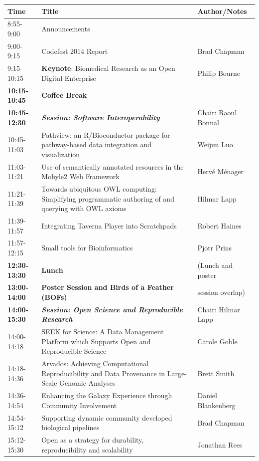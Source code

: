 \documentclass[12pt,oneside]{article}
\begin{document}
{\small
\begin{center}
\begin{tabular}{|p{2.175cm}|p{10.5cm}|p{3.7cm}|}
\hline
Time & Title & Author/Notes \\
\hline
8:55-9:00 & Announcements & \\
9:00-9:15 & Codefest 2014 Report & Brad Chapman\\
9:15-10:15 & \textbf{Keynote}: Biomedical Research as an Open Digital Enterprise & Philip Bourne\\
\hline
\textbf{10:15-10:45} & \textbf{Coffee Break} & \\
\hline
\textbf{10:45-12:30} & \textbf{\textit{Session: Software Interoperability}} & Chair: Raoul Bonnal\\
10:45-11:03 & Pathview: an R/Bioconductor package for pathway-based data integration and visualization & Weijun Luo\\
11:03-11:21 & Use of semantically annotated resources in the Mobyle2 Web Framework & Herv{\'e} M{\'e}nager\\
11:21-11:39 & Towards ubiquitous OWL computing: Simplifying programmatic authoring of and querying with OWL axioms & Hilmar Lapp\\
11:39-11:57 & Integrating Taverna Player into Scratchpads & Robert Haines\\
11:57-12:15 & Small tools for Bioinformatics & Pjotr Prins\\
\hline
\textbf{12:30-13:30} & \textbf{Lunch} & (Lunch and poster\\
\textbf{13:00-14:00} & \textbf{Poster Session and Birds of a Feather (BOFs)} & session overlap)\\
\hline
\textbf{14:00-15:30} & \textbf{\textit{Session: Open Science and Reproducible Research}} & Chair: Hilmar Lapp\\
14:00-14:18 & SEEK for Science: A Data Management Platform which Supports Open and Reproducible Science & Carole Goble\\
14:18-14:36 & Arvados: Achieving Computational Reproducibility and Data Provenance in Large-Scale Genomic Analyses & Brett Smith\\
14:36-14:54 & Enhancing the Galaxy Experience through Community Involvement & Daniel Blankenberg\\
14:54-15:12 & Supporting dynamic community developed biological pipelines & Brad Chapman\\
15:12-15:30 & Open as a strategy for durability, reproducibility and scalability & Jonathan Rees\\

\end{tabular}
\end{center}}
\end{document}
